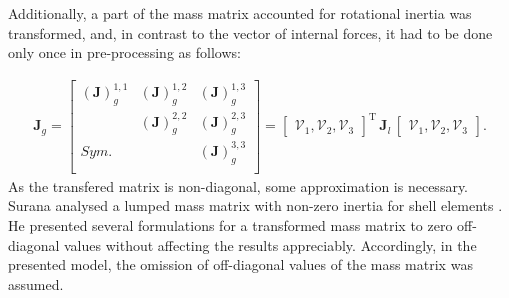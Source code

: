 Additionally, a part of the mass matrix accounted for rotational inertia was transformed, and, in contrast to the vector of internal forces, it had to be done only once in pre-processing as follows:

\begin{eqnarray}
	\textbf{J}_g=\left [ 
	\begin{array}{ccc}
		\left (\textbf{J}\right)^{1,1}_g & \left (\textbf{J}\right )^{1,2}_g & \left (\textbf{J}\right )^{1,3}_g\\
		& \left (\textbf{J}\right )^{2,2}_g & \left (\textbf{J}\right )^{2,3}_g\\
		Sym. &  & \left (\textbf{J}\right )^{3,3}_g\\
	\end{array}
	\right ]
	=\left[\begin{array}{ccc}
		\mathcal{V}_1, \mathcal{V}_2, \mathcal{V}_3 \end{array}\right ]^{\mathrm{T}}
	\,\textbf{J}_l\,
	\left[\begin{array}{ccc}
		\mathcal{V}_1, \mathcal{V}_2, \mathcal{V}_3 \end{array}\right ].
	\label{eq:inertia}
\end{eqnarray}
%
As the transfered matrix is non-diagonal, some approximation is necessary.
Surana analysed a lumped mass matrix with non-zero inertia for shell elements \cite{surana1980transition}.
He presented several formulations for a transformed mass matrix to zero off-diagonal values without affecting the results appreciably.
Accordingly, in the presented model, the omission of off-diagonal values of the mass matrix was assumed.